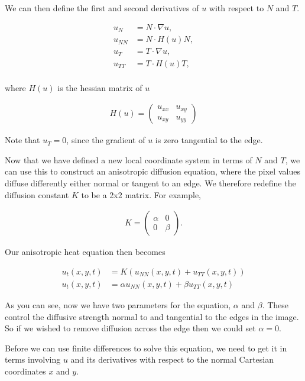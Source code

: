 \documentclass[11pt,a4paper,noindent]{article}
\begin{document}
We can then define the first and second derivatives of $u$ with respect
to $N$ and $T$.

\begin{align}
u_N &= N \cdot \nabla u,\\
u_{NN} &= N \cdot H(u) N,\\
u_T &= T \cdot \nabla u,\\
u_{TT} &= T \cdot H(u) T,\\
\end{align}

where $H(u)$ is the hessian matrix of $u$

\begin{align}
H(u) = \begin{pmatrix} u_{xx} & u_{xy} \\ u_{xy} & u_{yy} \end{pmatrix}
\end{align}

Note that $u_T=0$, since the gradient of $u$ is zero
tangential to the edge.

Now that we have defined a new local coordinate system in terms of
$N$ and $T$, we can use this to construct an anisotropic
diffusion equation, where the pixel values diffuse differently either
normal or tangent to an edge. We therefore redefine the diffusion constant $K$ to be a
2x2 matrix. For example,

\begin{align}
K = \begin{pmatrix} \alpha & 0 \\ 0 & \beta \end{pmatrix}.
\end{align}

Our anisotropic heat equation then becomes

\begin{align}
u_t(x,y,t) &= K (u_{NN}(x,y,t) + u_{TT}(x,y,t)) \\
u_t(x,y,t) &= \alpha u_{NN}(x,y,t) + \beta u_{TT}(x,y,t)
\end{align}

As you can see, now we have two parameters for the equation, $\alpha$ and $\beta$. These control the diffusive strength normal to and tangential to the edges in the image. So if we wished to remove diffusion across the edge then we could set $\alpha=0$.

Before we can use finite differences to solve this equation, we need to get it in terms involving $u$ and its derivatives with respect to the normal Cartesian coordinates $x$ and $y$.
\end{document}
